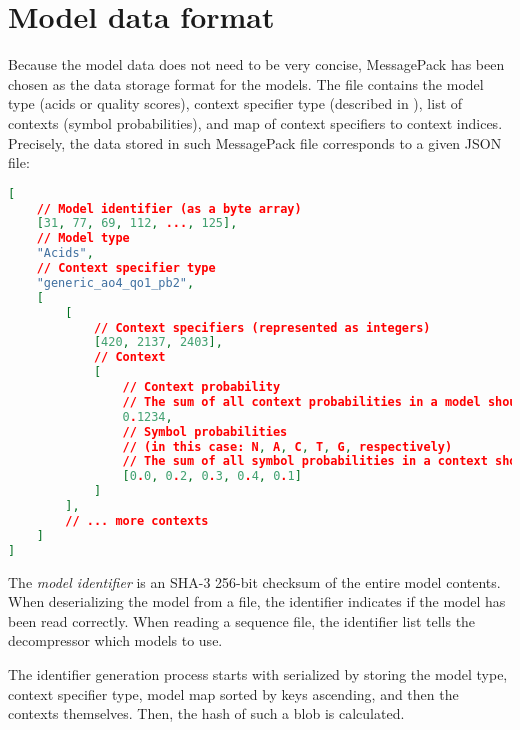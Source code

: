\section{Model data format}\label{sec:model-data-format}

Because the model data does not need to be very concise, MessagePack has been
chosen as the data storage format for the models.
The file contains the model type (acids or quality scores), context specifier
type (described in ), list of contexts (symbol
probabilities), and map of context specifiers to context indices.
Precisely, the data stored in such MessagePack file corresponds to a given
JSON file:



\begin{lstlisting}[language=json,firstnumber=1,label={lst:model-json}]
[
    // Model identifier (as a byte array)
    [31, 77, 69, 112, ..., 125],
    // Model type
    "Acids",
    // Context specifier type
    "generic_ao4_qo1_pb2",
    [
        [
            // Context specifiers (represented as integers)
            [420, 2137, 2403],
            // Context
            [
                // Context probability
                // The sum of all context probabilities in a model should be 1
                0.1234,
                // Symbol probabilities
                // (in this case: N, A, C, T, G, respectively)
                // The sum of all symbol probabilities in a context should be 1
                [0.0, 0.2, 0.3, 0.4, 0.1]
            ]
        ],
        // ... more contexts
    ]
]
\end{lstlisting}

The \emph{model identifier} is an SHA-3\cite{1421} 256-bit checksum of the
entire model contents.
When deserializing the model from a file, the identifier indicates if the
model has been read correctly.
When reading a sequence file, the identifier list tells the decompressor
which models to use.

The identifier generation process starts with serialized by storing the model
type, context specifier type, model map sorted by keys ascending, and then
the contexts themselves.
Then, the hash of such a blob is calculated.
